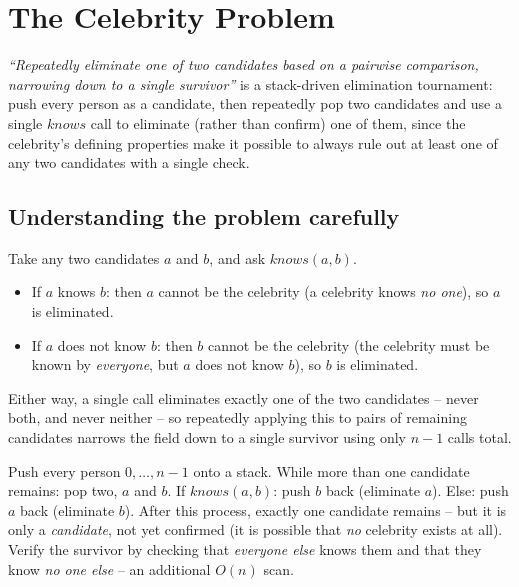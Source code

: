\section{The Celebrity Problem}
\label{sec:sq-celebrity-problem}


\begin{patternbox}
\emph{``Repeatedly eliminate one of two candidates based on a pairwise
comparison, narrowing down to a single survivor''} is a stack-driven
elimination tournament: push every person as a candidate, then repeatedly
pop two candidates and use a single $\textit{knows}$ call to eliminate
(rather than confirm) one of them, since the celebrity's defining
properties make it possible to always rule out at least one of any two
candidates with a single check.
\end{patternbox}

\subsection*{Understanding the problem carefully}

Take any two candidates $a$ and $b$, and ask $\textit{knows}(a,b)$.

\begin{itemize}
  \item If $a$ knows $b$: then $a$ cannot be the celebrity (a celebrity
        knows \emph{no one}), so $a$ is eliminated.
  \item If $a$ does not know $b$: then $b$ cannot be the celebrity (the
        celebrity must be known by \emph{everyone}, but $a$ does not
        know $b$), so $b$ is eliminated.
\end{itemize}

Either way, a single call eliminates exactly one of the two candidates --
never both, and never neither -- so repeatedly applying this to pairs of
remaining candidates narrows the field down to a single survivor using
only $n-1$ calls total.

\begin{ideabox}
Push every person $0, \dots, n-1$ onto a stack. While more than one
candidate remains: pop two, $a$ and $b$. If $\textit{knows}(a,b)$: push
$b$ back (eliminate $a$). Else: push $a$ back (eliminate $b$). After this
process, exactly one candidate remains -- but it is only a
\emph{candidate}, not yet confirmed (it is possible that \emph{no}
celebrity exists at all). Verify the survivor by checking that
\emph{everyone else} knows them and that they know \emph{no one else} --
an additional $O(n)$ scan.
\end{ideabox}

